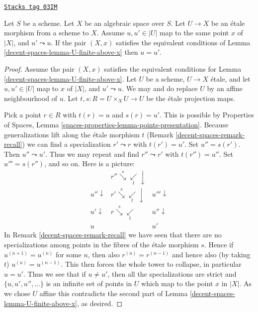 \begin{lemma}
\label{decent-spaces-lemma-no-specializations-map-to-same-point}
\href{https://stacks.math.columbia.edu/tag/03IM}{\texttt{Stacks tag 03IM}}

Let $S$ be a scheme.
Let $X$ be an algebraic space over $S$.
Let $U \to X$ be an \'etale morphism from a scheme to $X$.
Assume $u, u' \in |U|$ map to the same point $x$ of $|X|$, and
$u' \leadsto u$. If the pair $(X, x)$ satisfies the
equivalent conditions of
Lemma \ref{decent-spaces-lemma-U-finite-above-x}
then $u = u'$.
\end{lemma}

\begin{proof}
Assume the pair $(X, x)$ satisfies the
equivalent conditions for Lemma \ref{decent-spaces-lemma-U-finite-above-x}.
Let $U$ be a scheme, $U \to X$ \'etale, and
let $u, u' \in |U|$ map to $x$ of $|X|$, and
$u' \leadsto u$. We may and do replace $U$ by an affine
neighbourhood of $u$. Let $t, s : R = U \times_X U \to U$
be the \'etale projection maps.

\medskip\noindent
Pick a point $r \in R$ with $t(r) = u$ and $s(r) = u'$.
This is possible by
Properties of Spaces,
Lemma \ref{spaces-properties-lemma-points-presentation}.
Because generalizations lift along the \'etale morphism $t$
(Remark \ref{decent-spaces-remark-recall}) we can find a specialization $r' \leadsto r$ with
$t(r') = u'$. Set $u'' = s(r')$. Then $u'' \leadsto u'$.
Thus we may repeat and find $r'' \leadsto r'$ with
$t(r'') = u''$. Set $u''' = s(r'')$, and so on.
Here is a picture:
$$
\begin{array}{ccc} & r'' \overset{s}{\searrow}\underset{t}{\swarrow}\downarrow &  \\ u'' \downarrow & r' \overset{s}{\searrow}\underset{t}{\swarrow}\downarrow & u''' \downarrow \\ u' \downarrow & r \overset{s}{\searrow}\underset{t}{\swarrow} & u'' \downarrow \\ u &  & u'\end{array}
$$
In Remark \ref{decent-spaces-remark-recall} we have seen that there are no specializations
among points in the fibres of the \'etale morphism $s$. Hence if
$u^{(n + 1)} = u^{(n)}$ for some $n$, then also $r^{(n)} = r^{(n - 1)}$ and
hence also (by taking $t$) $u^{(n)} = u^{(n - 1)}$. This then forces the
whole tower to collapse, in particular $u = u'$. Thus we see that if
$u \not = u'$, then all the specializations are strict and
$\{u, u', u'', \ldots\}$ is an infinite set of points in $U$ which map to the
point $x$ in $|X|$. As we chose $U$ affine this contradicts the second part of
Lemma \ref{decent-spaces-lemma-U-finite-above-x}, as desired.
\end{proof}

